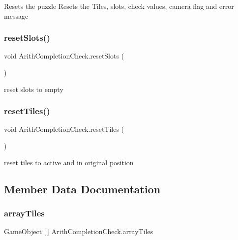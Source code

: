 Resets the puzzle Resets the Tiles, slots, check values, camera flag and error message \mbox{\label{class_arith_completion_check_a43f1f829ee2eb6fd6191c1e76565859b}} 
\subsubsection{\texorpdfstring{reset\+Slots()}{resetSlots()}}
{\footnotesize\ttfamily void Arith\+Completion\+Check.\+reset\+Slots (\begin{DoxyParamCaption}{ }\end{DoxyParamCaption})}



reset slots to empty 

\mbox{\label{class_arith_completion_check_ab9934c3847957162e5c0bccbe6a47c8c}} 
\subsubsection{\texorpdfstring{reset\+Tiles()}{resetTiles()}}
{\footnotesize\ttfamily void Arith\+Completion\+Check.\+reset\+Tiles (\begin{DoxyParamCaption}{ }\end{DoxyParamCaption})}



reset tiles to active and in original position 



\subsection{Member Data Documentation}
\mbox{\label{class_arith_completion_check_a6dd56d93f27bc485fc9354f665a87c2e}} 
\subsubsection{\texorpdfstring{array\+Tiles}{arrayTiles}}
{\footnotesize\ttfamily Game\+Object \mbox{[}$\,$\mbox{]} Arith\+Completion\+Check.\+array\+Tiles}



